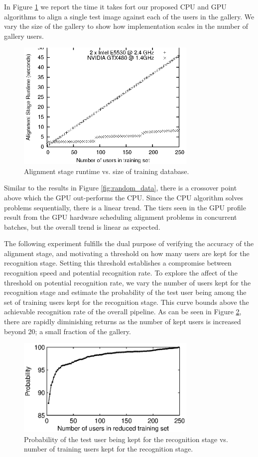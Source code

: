 \documentclass[10pt,twocolumn,letterpaper]{article}
\begin{document}
In Figure \ref{fig:alignment_stage_runtime} we report the time it takes fort
our proposed CPU and GPU algorithms to align a single test image against each
of the users in the gallery.  We vary the size of the gallery to show how
implementation scales in the number of gallery users.
\begin{figure}
\centering
\includegraphics[width=3.4in]{figures/alignment_runtime_graph}
\caption{Alignment stage runtime vs. size of training database.}
\label{fig:alignment_stage_runtime}
\end{figure}
Similar to the results in Figure \ref{fig:random_data},
there is a crossover point above which the GPU out-performs the CPU.  Since
the CPU algorithm solves problems sequentially, there is a linear trend.  
The tiers seen in the GPU profile result from the GPU hardware scheduling alignment
problems in concurrent batches, but the overall trend is linear as expected.

The following experiment fulfills the dual purpose of verifying the accuracy of
the alignment stage, and motivating a threshold on how many users are kept for
the recognition stage.  Setting this threshold establishes a compromise between
recognition speed and potential recognition rate.  To explore the affect of the
threshold on potential recognition rate, we vary the number of users kept for
the recognition stage and estimate the probability of the test user being
among the set of training users kept for the recognition stage.  This curve
bounds above the achievable recognition rate of the overall pipeline.  As can
be seen in Figure \ref{fig:user_alignment_rank_plot}, there are rapidly
diminishing returns as the number of kept users is increased beyond 20; a small
fraction of the gallery.
\begin{figure} 
\centering
\includegraphics[width=3.4in]{figures/user_alignment_rank_plot}
\caption{Probability of the test user being kept for the recognition stage vs.
number of training users kept for the recognition stage.}
\label{fig:user_alignment_rank_plot} \end{figure}
\end{document}
